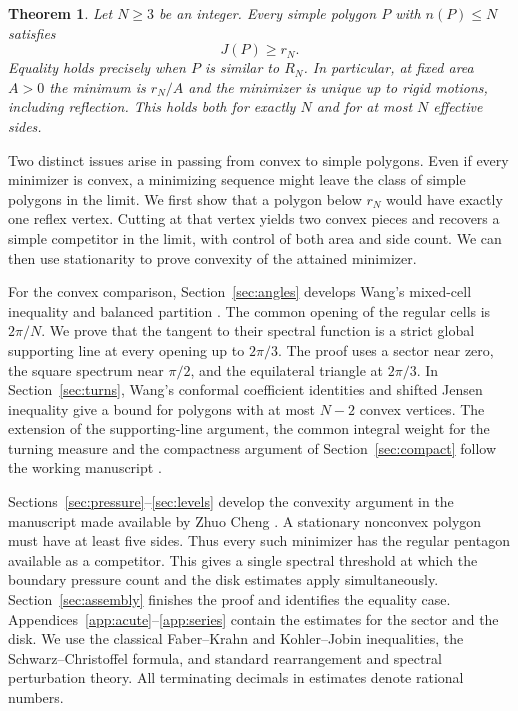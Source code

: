 \documentclass[11pt,a4paper,reqno]{amsart}
\newtheorem{theorem}{Theorem}[section]
\theoremstyle{remark}
\numberwithin{equation}{section}
\begin{document}
\begin{theorem}\label{thm:main}
Let $N\ge3$ be an integer. Every simple polygon $P$ with $n(P)\le N$ satisfies
\begin{equation}\label{eq:main}
                         J(P)\ge r_N .
\end{equation}
Equality holds precisely when $P$ is similar to $R_N$. In particular, at fixed
area $A>0$ the minimum is $r_N/A$ and the minimizer is unique up to rigid
motions, including reflection. This holds both for exactly $N$ and for at most
$N$ effective sides.
\end{theorem}

Two distinct issues arise in passing from convex to simple polygons. Even
if every minimizer is convex, a minimizing sequence might leave the class of
simple polygons in the limit. We first show that a polygon below $r_N$ would
have exactly one reflex vertex. Cutting at that vertex yields two convex
pieces and recovers a simple competitor in the limit, with control of both area
and side count. We can then use stationarity to prove convexity of the attained
minimizer.

For the convex comparison, Section~\ref{sec:angles} develops Wang's mixed-cell
inequality and balanced partition \cite[Lemmas~2.1 and~2.2]{wang}. The common
opening of the regular cells is $2\pi/N$. We prove that the tangent to their
spectral function is a strict global supporting line at every opening up to
$2\pi/3$. The proof uses a sector near zero, the square spectrum near $\pi/2$,
and the equilateral triangle at $2\pi/3$. In Section~\ref{sec:turns}, Wang's
conformal coefficient identities and shifted Jensen inequality
\cite[Lemmas~3.1--3.3]{wang} give a bound for polygons with at most $N-2$ convex
vertices. The extension of the supporting-line argument, the common integral
weight for the turning measure and the compactness argument of
Section~\ref{sec:compact} follow the working manuscript \cite{unified}.

Sections~\ref{sec:pressure}--\ref{sec:levels} develop the convexity argument
in the manuscript made available by Zhuo Cheng \cite{cheng}. A stationary nonconvex
polygon must have at least five sides. Thus every such minimizer has the regular
pentagon available as a competitor. This gives a single spectral threshold at
which the boundary pressure count and the disk estimates apply simultaneously.
Section~\ref{sec:assembly} finishes the proof and identifies the equality case.
Appendices~\ref{app:acute}--\ref{app:series} contain the estimates for the sector
and the disk. We use the classical Faber--Krahn and Kohler--Jobin inequalities,
the Schwarz--Christoffel formula, and standard rearrangement and spectral
perturbation theory. All terminating decimals in estimates denote rational numbers.
\end{document}

